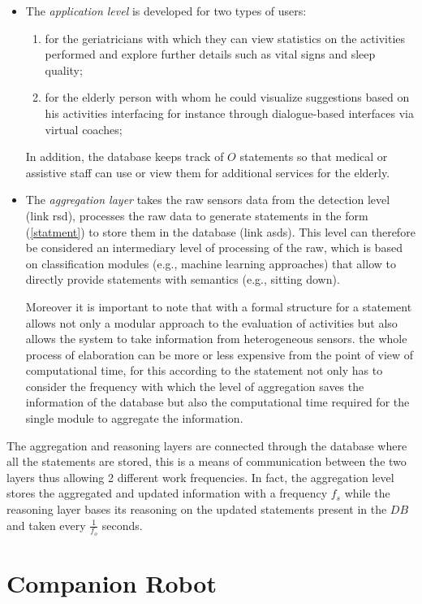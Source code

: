 \documentclass{thesisreport}
\begin{document}
\begin{itemize}
    \item The \textit{application level} is developed for two types of users:
    \begin{enumerate}
        \item for the geriatricians with which they can view statistics on the activities performed and explore further details such as vital signs and sleep quality;
        \item for the elderly person with whom he could visualize suggestions based on his activities interfacing for instance through dialogue-based interfaces via virtual coaches;
    \end{enumerate}
    In addition, the database keeps track of $O$ statements so that medical or assistive staff can use or view them for additional services for the elderly.
    \item The \textit{aggregation layer} takes the raw sensors data from the detection level (link rsd), processes the raw data to generate statements in the form (\ref{statment}) to store them in the database (link asds). This level can therefore be considered an intermediary level of processing of the raw, which is based on classification modules (e.g., machine learning approaches) that allow to directly provide statements with semantics (e.g., sitting down).
    
    Moreover it is important to note that with a formal structure for a statement allows not only a modular approach to the evaluation of activities but also allows the system to take information from heterogeneous sensors. the whole process of elaboration can be more or less expensive from the point of view of computational time, for this according to the statement not only has to consider the frequency with which the level of aggregation saves the information of the database but also the computational time required for the single module to aggregate the information.
 \end{itemize}
 
  The aggregation and reasoning layers are connected through the database where all the statements are stored, this is a means of communication between the two layers thus allowing 2 different work frequencies. In fact, the aggregation level stores the aggregated and updated information with a frequency $f_s$ while the reasoning layer bases its reasoning on the updated statements present in the $DB$ and taken every $\frac{1}{f_o}$ seconds.
 
 \section{Companion Robot}  \label{companionRobot}
 
\end{document}
